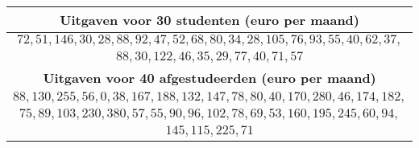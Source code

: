 








\begin{center}
    \begin{tabular}{c}
        \toprule
            \textbf{Uitgaven voor 30 studenten (euro per maand)} \\
        \midrule
            $72, 51, 146, 30, 28, 88, 92, 47, 52, 68, 80, 34, 28, 105, 76, 93, 55, 40, 62, 37,$ \\
            $88, 30, 122, 46, 35, 29, 77, 40, 71, 57$ \\
        \midrule
            \textbf{Uitgaven voor 40 afgestudeerden (euro per maand)} \\
        \midrule
            $88, 130, 255, 56, 0, 38, 167, 188, 132, 147, 78, 80, 40, 170, 280, 46, 174, 182,$ \\
            $75, 89, 103, 230, 380, 57, 55, 90, 96, 102, 78, 69, 53, 160, 195, 245, 60, 94,$ \\
            $145, 115, 225, 71$ \\
        \bottomrule
    \end{tabular}
\end{center}

